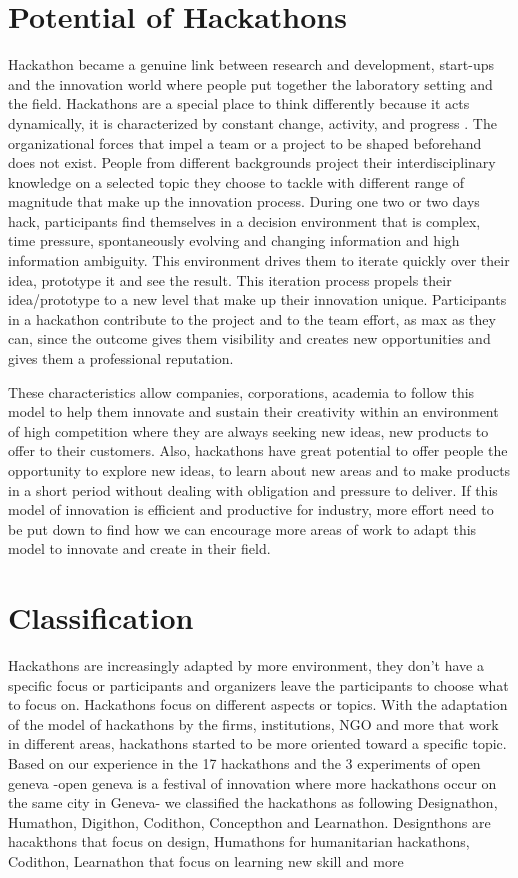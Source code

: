 \section{Potential of Hackathons}
Hackathon became a genuine link between research and development, start-ups and the innovation world where people put together the laboratory setting and the field. Hackathons are a special place to think differently because it acts dynamically, it is characterized by constant change, activity, and progress \cite{Thesishackinnovation2015}. The organizational forces that impel a team or a project to be shaped beforehand does not exist. People from different backgrounds project their interdisciplinary knowledge on a selected topic they choose to tackle with different range of magnitude that make up the innovation process. During one two or two days hack, participants find themselves in a decision environment that is complex, time pressure, spontaneously evolving and changing information and high information ambiguity. This environment drives them to iterate quickly over their idea, prototype it and see the result. This iteration process propels their idea/prototype to a new level that make up their innovation unique. Participants in a hackathon contribute to the project and to the team effort, as max as they can, since the outcome gives them visibility and creates new opportunities and gives them a professional reputation.

These characteristics allow companies, corporations, academia to follow this model to help them innovate and sustain their creativity within an environment of high competition where they are always seeking new ideas, new products to offer to their customers. Also, hackathons have great potential to offer people the opportunity to explore new ideas, to learn about new areas and to make products in a short period without dealing with obligation and pressure to deliver. If this model of innovation is efficient and productive for industry, more effort need to be put down to find how we can encourage more areas of work to adapt this model to innovate and create in their field.

\section{Classification}
Hackathons are increasingly adapted by more environment, they don't have a specific focus or participants and organizers leave the participants to choose what to focus on. Hackathons focus on different aspects or topics. With the adaptation of the model of hackathons by the firms, institutions, NGO and more that work in different areas, hackathons started to be more oriented toward a specific topic. Based on our experience in the 17 hackathons and the 3 experiments of open geneva -open geneva is a festival of innovation where more hackathons occur on the same city in Geneva- we classified the hackathons as following Designathon, Humathon, Digithon, Codithon, Concepthon and Learnathon. Designthons are hacakthons that focus on design, Humathons for humanitarian hackathons, Codithon, Learnathon that focus on learning new skill
 and more

